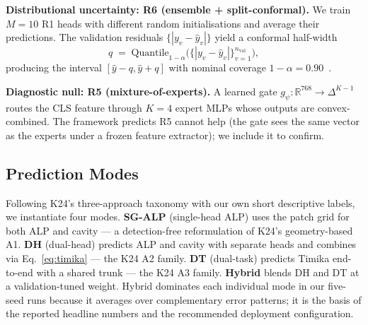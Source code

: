 \documentclass[runningheads]{llncs}
\begin{document}
\smallskip\noindent\textbf{Distributional uncertainty: R6 (ensemble + split-conformal).}
We train $M{=}10$ R1 heads with different random initialisations and average their predictions. The validation residuals $\{|y_v - \hat{y}_v|\}$ yield a conformal half-width
\begin{equation}
q \;=\; \mathrm{Quantile}_{1-\alpha}\bigl(\{|y_v - \hat{y}_v|\}_{v=1}^{n_{\text{val}}}\bigr),
\label{eq:conformal}
\end{equation}
producing the interval $[\hat{y}-q, \hat{y}+q]$ with nominal coverage $1-\alpha=0.90$~\cite{angelopoulos2023conformalintro}.

\smallskip\noindent\textbf{Diagnostic null: R5 (mixture-of-experts).}
A learned gate $g_\psi : \mathbb{R}^{768} \to \Delta^{K-1}$ routes the CLS feature through $K{=}4$ expert MLPs whose outputs are convex-combined. The framework predicts R5 cannot help (the gate sees the same vector as the experts under a frozen feature extractor); we include it to confirm.

\subsection{Prediction Modes}
\label{sec:fusion}

Following K24's three-approach taxonomy with our own short descriptive labels, we instantiate four modes. \textbf{SG-ALP} (single-head ALP) uses the patch grid for both ALP and cavity --- a detection-free reformulation of K24's geometry-based A1. \textbf{DH} (dual-head) predicts ALP and cavity with separate heads and combines via Eq.~\ref{eq:timika} --- the K24 A2 family. \textbf{DT} (dual-task) predicts Timika end-to-end with a shared trunk --- the K24 A3 family. \textbf{Hybrid} blends DH and DT at a validation-tuned weight. Hybrid dominates each individual mode in our five-seed runs because it averages over complementary error patterns; it is the basis of the reported headline numbers and the recommended deployment configuration.
\end{document}
